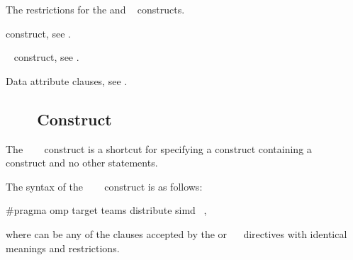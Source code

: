 \restrictions
The restrictions for the  and ~ constructs.

\begin{crossrefs}
\item {} construct, see
.

\item {}~ construct, see
.

\item Data attribute clauses, see
.
\end{crossrefs}



\subsection{~~~ Construct}
\label{subsec:target teams distribute simd construct}
\summary
The ~~~ construct is a 
shortcut for specifying a  construct containing a 
~~ construct and no other statements.

\syntax
\begin{ccppspecific}
The syntax of the ~~~ 
construct is as follows:

\begin{ompcPragma}
#pragma omp target teams distribute simd \
            \plc{[clause[ [},\plc{] clause] ...  ] new-line}
\end{ompcPragma}

where  can be any of the clauses accepted by the  or
\code{teams}~\code{distribute}~\code{simd} directives with identical meanings 
and restrictions.
\end{ccppspecific}

